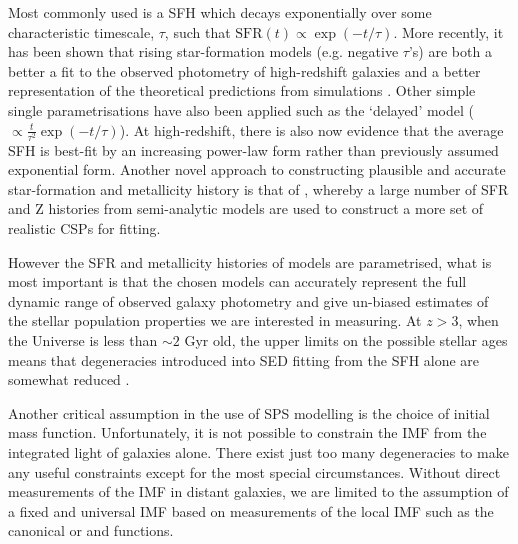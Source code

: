 Most commonly used is a SFH which decays exponentially over some characteristic timescale, $\tau$, such that $\text{SFR}(t) \propto \exp(-t/\tau)$. More recently, it has been shown that rising star-formation models (e.g. negative $\tau$'s) are both a better a fit to the observed photometry of high-redshift galaxies \citep{Maraston:2010dl} and a better representation of the theoretical predictions from simulations \citep{2011MNRAS.410.1703F,Dayal:2013jm}. Other simple single parametrisations have also been applied such as the `delayed' model ($\propto \frac{t}{\tau^{2}} \exp(-t/\tau)$). At high-redshift, there is also now evidence that the average SFH is best-fit by an increasing power-law form \citep{2011MNRAS.412.1123P,Salmon:2014tm} rather than previously assumed exponential form. Another novel approach to constructing plausible and accurate star-formation and metallicity history is that of \citet{Pacifici:2012fr}, whereby a large number of SFR and Z histories from semi-analytic models are used to construct a more set of realistic CSPs for fitting.

However the SFR and metallicity histories of models are parametrised, what is most important is that the chosen models can accurately represent the full dynamic range of observed galaxy photometry and give un-biased estimates of the stellar population properties we are interested in measuring. At $z > 3$, when the Universe is less than $\sim 2$ Gyr old, the upper limits on the possible stellar ages means that degeneracies introduced into SED fitting from the SFH alone are somewhat reduced \citep{2013A&A...549A...4S}.

Another critical assumption in the use of SPS modelling is the choice of initial mass function. Unfortunately, it is not possible to constrain the IMF from the integrated light of galaxies alone. There exist just too many degeneracies to make any useful constraints except for the most special circumstances.  Without direct measurements of the IMF in distant galaxies, we are limited to the assumption of a fixed and universal IMF based on measurements of the local IMF such as the canonical \citet{Salpeter:1955hz} or \citet{Chabrier:2003ki} and \citet{Kroupa:2001ki} functions. 

